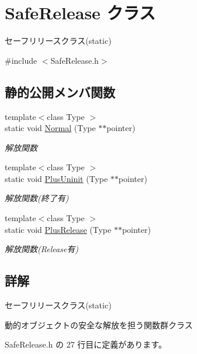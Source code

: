 \hypertarget{class_safe_release}{}\section{Safe\+Release クラス}
\label{class_safe_release}


セーフリリースクラス(static)  




{\ttfamily \#include $<$Safe\+Release.\+h$>$}

\subsection*{静的公開メンバ関数}
\begin{DoxyCompactItemize}
\item 
{\footnotesize template$<$class Type $>$ }\\static void \mbox{\hyperlink{class_safe_release_a6ecab682df939c28d8867a67c2f4b51f}{Normal}} (Type $\ast$$\ast$pointer)
\begin{DoxyCompactList}\small\item\em 解放関数 \end{DoxyCompactList}\item 
{\footnotesize template$<$class Type $>$ }\\static void \mbox{\hyperlink{class_safe_release_a06160f5466a88f021e6f28489de9df1e}{Plus\+Uninit}} (Type $\ast$$\ast$pointer)
\begin{DoxyCompactList}\small\item\em 解放関数(終了有) \end{DoxyCompactList}\item 
{\footnotesize template$<$class Type $>$ }\\static void \mbox{\hyperlink{class_safe_release_a507950335a85da67c1722cce83dca9ae}{Plus\+Release}} (Type $\ast$$\ast$pointer)
\begin{DoxyCompactList}\small\item\em 解放関数(Release有) \end{DoxyCompactList}\end{DoxyCompactItemize}


\subsection{詳解}
セーフリリースクラス(static) 

動的オブジェクトの安全な解放を担う関数群クラス 

 Safe\+Release.\+h の 27 行目に定義があります。




